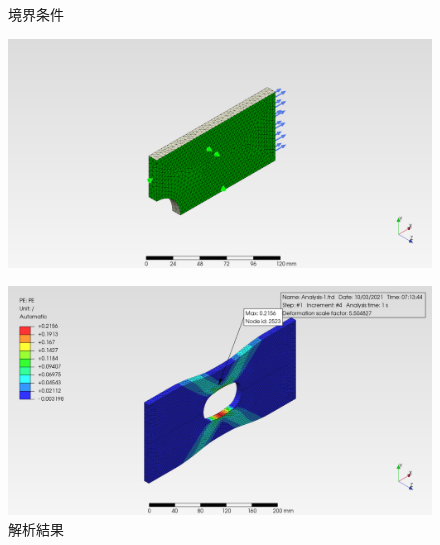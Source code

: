 \documentclass[a4j,20pt,slide]{ltjsarticle}
\begin{document}
\begin{figure}[H]
	\begin{minipage}{.49\hsize}
		\caption{境界条件}
		\label{07-01}
		\centering
		\includegraphics[width=.95\columnwidth]{fig/07-01.png}
	\end{minipage}
	\begin{minipage}{.49\hsize}
		\caption{解析結果}
		\label{07-02}
		\centering
		\includegraphics[width=.95\columnwidth]{fig/07-02.png}
	\end{minipage}
\end{figure}
\clearpage
%
\end{document}
